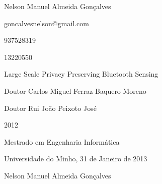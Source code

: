 \par\vspace{10mm}
 Nelson Manuel Almeida Gonçalves
\par\vspace{3mm}
 goncalvesnelson@gmail.com
\par\vspace{3mm}
 937528319
\par\vspace{3mm}
 13220550
\par\vspace{3mm}
 Large Scale Privacy Preserving Bluetooth Sensing
\par\vspace{3mm}
 Doutor Carlos Miguel Ferraz Baquero Moreno
\par\vspace{3mm}
 Doutor Rui João Peixoto José
\par\vspace{3mm}
 2012
\par\vspace{3mm}
 Mestrado em Engenharia Informática
\par\vspace{20mm}
\par\vspace{10mm}
\begin{center}
Universidade do Minho, 31 de Janeiro de 2013
\par\vspace{3mm}
Nelson Manuel Almeida Gonçalves
\end{center}
